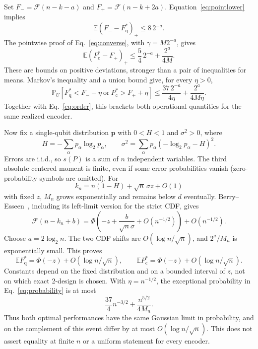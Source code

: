 \documentclass[aps,prl,onecolumn,superscriptaddress,amsmath,amssymb]{revtex4-2}
\newcommand{\E}{\mathbb E}
\newcommand{\Prb}{\mathbb P}
\newcommand{\Pc}{P_{\mathrm c}^{*}}
\newcommand{\Fq}{F_{\mathrm q}^{*}}
\newcommand{\Fs}{\mathcal F}
\begin{document}
Set $F_- =\Fs(n-k-a)$ and $F_+=\Fs(n-k+2a)$. Equation~\eqref{eq:pointlower} implies
\begin{equation}
\E(F_- -\Fq)_+\le8\,2^{-a}.
\end{equation}
The pointwise proof of Eq.~\eqref{eq:converse}, with $\gamma=M2^{-a}$, gives
\begin{equation}
\E(\Pc-F_+)_+\le\frac54\,2^{-a}+\frac{2^a}{4M}.
\end{equation}
These are bounds on positive deviations, stronger than a pair of inequalities for means. Markov's inequality and a union bound give, for every $\eta>0$,
\begin{equation}
\Prb_U[\Fq<F_--\eta\ \text{or}\ \Pc>F_++\eta]
\le \frac{37\,2^{-a}}{4\eta}+\frac{2^a}{4M\eta}.
\label{eq:probability}
\end{equation}
Together with Eq.~\eqref{eq:order}, this brackets both operational quantities for the same realized encoder.

Now fix a single-qubit distribution $\bm p$ with $0<H<1$ and $\sigma^2>0$, where
\begin{equation}
H=-\sum_\alpha p_\alpha\log_2p_\alpha,\qquad
\sigma^2=\sum_\alpha p_\alpha(-\log_2p_\alpha-H)^2.
\end{equation}
Errors are i.i.d., so $s(P)$ is a sum of $n$ independent variables. The third absolute centered moment is finite, even if some error probabilities vanish (zero-probability symbols are omitted). For
\begin{equation}
k_n=n(1-H)+\sqrt n\,\sigma z+O(1)
\end{equation}
with fixed $z$, $M_n$ grows exponentially and remains below $d$ eventually. Berry--Esseen~\cite{Feller}, including its left-limit version for the strict CDF, gives
\begin{equation}
\Fs(n-k_n+b)=\Phi\!\left(-z+\frac b{\sqrt n\sigma}+O(n^{-1/2})\right)+O(n^{-1/2}).
\end{equation}
Choose $a=2\log_2n$. The two CDF shifts are $O(\log n/\sqrt n)$, and $2^a/M_n$ is exponentially small. This proves
\begin{equation}
\E\Fq=\Phi(-z)+O(\log n/\sqrt n),\qquad
\E\Pc=\Phi(-z)+O(\log n/\sqrt n).
\label{eq:gaussian}
\end{equation}
Constants depend on the fixed distribution and on a bounded interval of $z$, not on which exact 2-design is chosen. With $\eta=n^{-1/2}$, the exceptional probability in Eq.~\eqref{eq:probability} is at most
\begin{equation}
\frac{37}{4}n^{-3/2}+\frac{n^{5/2}}{4M_n}.
\end{equation}
Thus both optimal performances have the same Gaussian limit in probability, and on the complement of this event differ by at most $O(\log n/\sqrt n)$. This does not assert equality at finite $n$ or a uniform statement for every encoder.
\end{document}

